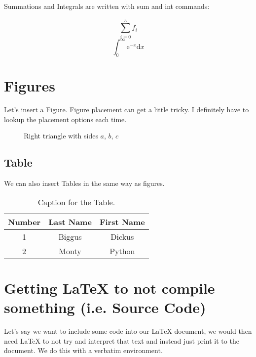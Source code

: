 \documentclass[12pt]{article}
\begin{document}
Summations and Integrals are written with sum and int commands:

\begin{equation} 
  \sum_{i=0}^{5} f_{i}
\end{equation} 
\begin{equation} 
  \int_{0}^{\infty} \mathrm{e}^{-x} \mathrm{d}x
\end{equation} 

\section{Figures}

Let's insert a Figure. Figure placement can get a little tricky. 
I definitely have to lookup the placement options each time.

\begin{figure}[H] %
    \centering %
    \caption{Right triangle with sides $a$, $b$, $c$}
    \label{fig:right-triangle}
\end{figure}

\subsection{Table}
We can also insert Tables in the same way as figures.

\begin{table}[H]
  \caption{Caption for the Table.}
  \begin{tabular}{c|cc} 
    Number &  Last Name & First Name \\ %
    \hline %
    1 & Biggus & Dickus \\
    2 & Monty & Python
  \end{tabular}
\end{table}

\section{Getting \LaTeX \hspace{1pt} to not compile something (i.e. Source Code)}
Let's say we want to include some code into our \LaTeX \hspace{1pt} document,
we would then need \LaTeX \hspace{1pt} to not try and interpret that text and
instead just print it to the document. We do this with a verbatim 
environment. 
\end{document}
